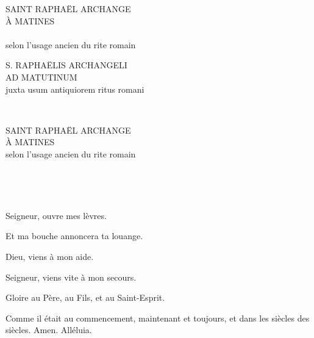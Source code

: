 \documentclass[twoside]{article}
\begin{document}
\null\vfill

\begin{center}\begin{doublespace}
{
\MakeUppercase{\Large Saint Raphaël Archange\\À Matines}\\~\\
selon l'usage ancien du rite romain}
\end{doublespace}\end{center}

\vfill\newpage

\sloppy

\begin{paracol}[1]{2}

\begin{center}\begin{doublespace}

{
\MakeUppercase{\Large S. Raphaëlis Archangeli\\ad Matutinum}\\
juxta usum antiquiorem ritus romani}
\end{doublespace}\end{center}

~~

\switchcolumn

\begin{center}\begin{doublespace}
{
\MakeUppercase{\Large Saint Raphaël Archange\\À Matines}\\
selon l'usage ancien du rite romain}
\end{doublespace}\end{center}

~~

~~

\vv Seigneur, ouvre mes lèvres.

\rr Et ma bouche annoncera ta louange.

\vv Dieu, viens à mon aide.

\rr Seigneur, viens vite à mon secours.

\vv Gloire au Père, au Fils, et au Saint-Esprit.

\rr Comme il était au commencement, maintenant et toujours, et dans les siècles des siècles. Amen. Alléluia.

\switchcolumn*


\end{paracol}
\end{document}
